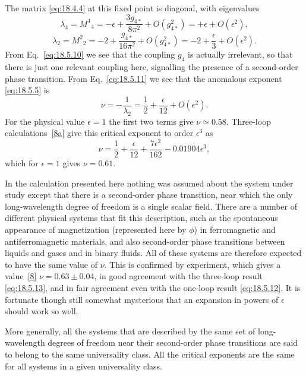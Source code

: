 The matrix \eqref{eq:18.4.4} at this fixed point is diagonal, with eigenvalues
\begin{equation}
\lambda_4=M^4{}_4=-\epsilon+\frac{3g_{4*}}{8\pi^2}
+O(g_{4*}^2)=+\epsilon+O(\epsilon^2),
\tag{18.5.10}\label{eq:18.5.10}
\end{equation}
\begin{equation}
\lambda_2=M^2{}_2=-2+\frac{g_{4*}}{16\pi^2}
+O(g_{4*}^2)=-2+\frac{\epsilon}{3}+O(\epsilon^2).
\tag{18.5.11}\label{eq:18.5.11}
\end{equation}
From Eq.~\eqref{eq:18.5.10} we see that the coupling $g_4$ is actually irrelevant, so that there is just one relevant coupling here, signalling the presence of a second-order phase transition. From Eq.~\eqref{eq:18.5.11} we see that the anomalous exponent \eqref{eq:18.5.5} is
\begin{equation}
\nu=-\frac{1}{\lambda_2}=\frac{1}{2}+\frac{\epsilon}{12}+O(\epsilon^2).
\tag{18.5.12}\label{eq:18.5.12}
\end{equation}
For the physical value $\epsilon=1$ the first two terms give $\nu\simeq0.58$. Three-loop calculations~\hyperref[ch18-ref-8a]{[8a]} give this critical exponent to order $\epsilon^3$ as
\begin{equation}
\nu=\frac{1}{2}+\frac{\epsilon}{12}+\frac{7\epsilon^2}{162}
-0.01904\epsilon^3,
\tag{18.5.13}\label{eq:18.5.13}
\end{equation}
which for $\epsilon=1$ gives $\nu=0.61$.

In the calculation presented here nothing was assumed about the system under study except that there is a second-order phase transition, near which the only long-wavelength degree of freedom is a single scalar field. There are a number of different physical systems that fit this description, such as the spontaneous appearance of magnetization (represented here by $\phi$) in ferromagnetic and antiferromagnetic materials, and also second-order phase transitions between liquids and gases and in binary fluids. All of these systems are therefore expected to have the same value of $\nu$. This is confirmed by experiment, which gives a value~\hyperref[ch18-ref-8]{[8]} $\nu=0.63\pm0.04$, in good agreement with the three-loop result \eqref{eq:18.5.13}, and in fair agreement even with the one-loop result \eqref{eq:18.5.12}. It is fortunate though still somewhat mysterious that an expansion in powers of $\epsilon$ should work so well.

More generally, all the systems that are described by the same set of long-wavelength degrees of freedom near their second-order phase transitions are said to belong to the same universality class. All the critical exponents are the same for all systems in a given universality class.
